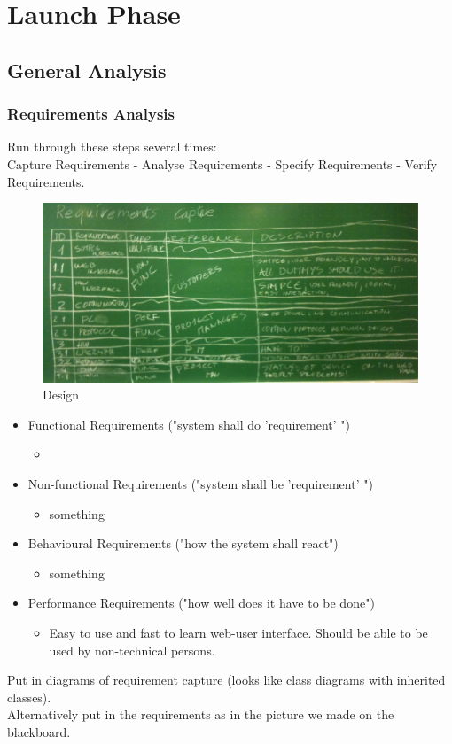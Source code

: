 \newpage
\section{Launch Phase}
\subsection{General Analysis}
	\subsubsection{Requirements	 Analysis}
	Run through these steps several times:\\
	Capture Requirements - Analyse Requirements - Specify Requirements - Verify Requirements.
		\begin{figure}[h!]		%
			\begin{centering}
				 \includegraphics[width=1.0\textwidth]{images/requirement_capture.JPG}
		 		\caption{Design}
			 \end{centering}
		\end{figure}
		\begin{itemize}
			\item Functional Requirements ("system shall do 'requirement' ")
				\begin{itemize}
					\item
				\end{itemize}
			\item Non-functional Requirements ("system shall be 'requirement' ")
				\begin{itemize}
					\item something					
				\end{itemize}
			\item Behavioural Requirements ("how the system shall react")
				\begin{itemize}
					\item something
				\end{itemize}
			\item Performance Requirements ("how well does it have to be done")
				\begin{itemize}
					\item Easy to use and fast to learn web-user interface. Should be able to be used by non-technical persons.
				\end{itemize}
		\end{itemize}
		Put in diagrams of requirement capture (looks like class diagrams with inherited classes).\\
		Alternatively put in the requirements as in the picture we made on the blackboard.
